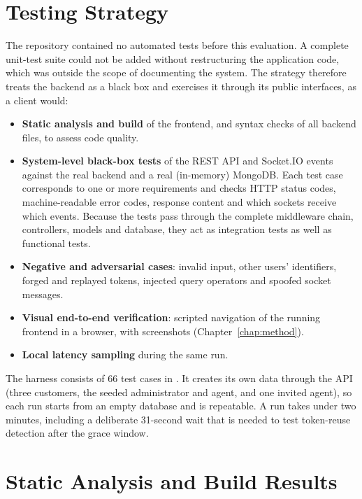\section{Testing Strategy}
\label{sec:strategy}

The repository contained no automated tests before this evaluation. A complete unit-test suite could not be added without restructuring the application code, which was outside the scope of documenting the system. The strategy therefore treats the backend as a black box and exercises it through its public interfaces, as a client would:

\begin{itemize}
  \item \textbf{Static analysis and build} of the frontend, and syntax checks of all backend files, to assess code quality.
  \item \textbf{System-level black-box tests} of the REST API and Socket.IO events against the real backend and a real (in-memory) MongoDB. Each test case corresponds to one or more requirements and checks HTTP status codes, machine-readable error codes, response content and which sockets receive which events. Because the tests pass through the complete middleware chain, controllers, models and database, they act as integration tests as well as functional tests.
  \item \textbf{Negative and adversarial cases}: invalid input, other users' identifiers, forged and replayed tokens, injected query operators and spoofed socket messages.
  \item \textbf{Visual end-to-end verification}: scripted navigation of the running frontend in a browser, with screenshots (Chapter~\ref{chap:method}).
  \item \textbf{Local latency sampling} during the same run.
\end{itemize}

The harness consists of 66 test cases in . It creates its own data through the API (three customers, the seeded administrator and agent, and one invited agent), so each run starts from an empty database and is repeatable. A run takes under two minutes, including a deliberate 31-second wait that is needed to test token-reuse detection after the grace window.

\section{Static Analysis and Build Results}
\label{sec:static}

